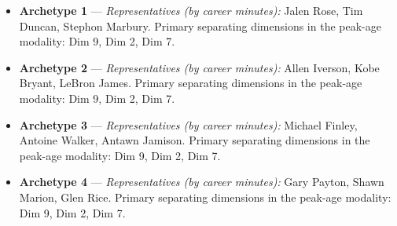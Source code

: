 \begin{itemize}
\item \textbf{Archetype 1} --- \emph{Representatives (by career minutes):} Jalen Rose, Tim Duncan, Stephon Marbury. Primary separating dimensions in the peak-age modality: Dim 9, Dim 2, Dim 7.
\item \textbf{Archetype 2} --- \emph{Representatives (by career minutes):} Allen Iverson, Kobe Bryant, LeBron James. Primary separating dimensions in the peak-age modality: Dim 9, Dim 2, Dim 7.
\item \textbf{Archetype 3} --- \emph{Representatives (by career minutes):} Michael Finley, Antoine Walker, Antawn Jamison. Primary separating dimensions in the peak-age modality: Dim 9, Dim 2, Dim 7.
\item \textbf{Archetype 4} --- \emph{Representatives (by career minutes):} Gary Payton, Shawn Marion, Glen Rice. Primary separating dimensions in the peak-age modality: Dim 9, Dim 2, Dim 7.
\end{itemize}
